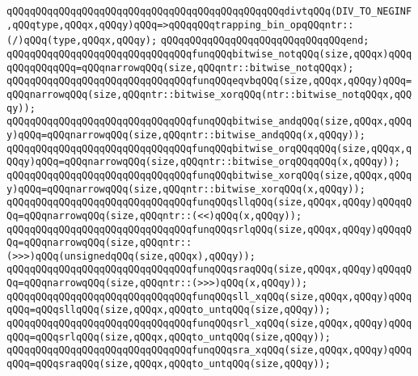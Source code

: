 \verb|qQQqqQQqqQQqqQQqqQQqqQQqqQQqqQQqqQQqqQQqqQQqqQQqdivtqQQq(DIV_TO_NEGINF,qQQqtype,qQQqx,qQQqy)qQQq=>qQQqqQQqtrapping_bin_opqQQqntr::(/)qQQq(type,qQQqx,qQQqy);|\newline
\verb|qQQqqQQqqQQqqQQqqQQqqQQqqQQqqQQqend;|\newline
\newline
\verb|qQQqqQQqqQQqqQQqqQQqqQQqqQQqqQQqfunqQQqbitwise_notqQQq(size,qQQqx)qQQqqQQqqQQqqQQq=qQQqnarrowqQQq(size,qQQqntr::bitwise_notqQQqx);|\newline
\verb|qQQqqQQqqQQqqQQqqQQqqQQqqQQqqQQqfunqQQqeqvbqQQq(size,qQQqx,qQQqy)qQQq=qQQqnarrowqQQq(size,qQQqntr::bitwise_xorqQQq(ntr::bitwise_notqQQqx,qQQqy));|\newline
\newline
\verb|qQQqqQQqqQQqqQQqqQQqqQQqqQQqqQQqfunqQQqbitwise_andqQQq(size,qQQqx,qQQqy)qQQq=qQQqnarrowqQQq(size,qQQqntr::bitwise_andqQQq(x,qQQqy));|\newline
\verb|qQQqqQQqqQQqqQQqqQQqqQQqqQQqqQQqfunqQQqbitwise_orqQQqqQQq(size,qQQqx,qQQqy)qQQq=qQQqnarrowqQQq(size,qQQqntr::bitwise_orqQQqqQQq(x,qQQqy));|\newline
\verb|qQQqqQQqqQQqqQQqqQQqqQQqqQQqqQQqfunqQQqbitwise_xorqQQq(size,qQQqx,qQQqy)qQQq=qQQqnarrowqQQq(size,qQQqntr::bitwise_xorqQQq(x,qQQqy));|\newline
\newline
\verb|qQQqqQQqqQQqqQQqqQQqqQQqqQQqqQQqfunqQQqsllqQQq(size,qQQqx,qQQqy)qQQqqQQq=qQQqnarrowqQQq(size,qQQqntr::(<<)qQQq(x,qQQqy));|\newline
\verb|qQQqqQQqqQQqqQQqqQQqqQQqqQQqqQQqfunqQQqsrlqQQq(size,qQQqx,qQQqy)qQQqqQQq=qQQqnarrowqQQq(size,qQQqntr::(>>>)qQQq(unsignedqQQq(size,qQQqx),qQQqy));|\newline
\verb|qQQqqQQqqQQqqQQqqQQqqQQqqQQqqQQqfunqQQqsraqQQq(size,qQQqx,qQQqy)qQQqqQQq=qQQqnarrowqQQq(size,qQQqntr::(>>>)qQQq(x,qQQqy));|\newline
\newline
\verb|qQQqqQQqqQQqqQQqqQQqqQQqqQQqqQQqfunqQQqsll_xqQQq(size,qQQqx,qQQqy)qQQqqQQq=qQQqsllqQQq(size,qQQqx,qQQqto_untqQQq(size,qQQqy));|\newline
\verb|qQQqqQQqqQQqqQQqqQQqqQQqqQQqqQQqfunqQQqsrl_xqQQq(size,qQQqx,qQQqy)qQQqqQQq=qQQqsrlqQQq(size,qQQqx,qQQqto_untqQQq(size,qQQqy));|\newline
\verb|qQQqqQQqqQQqqQQqqQQqqQQqqQQqqQQqfunqQQqsra_xqQQq(size,qQQqx,qQQqy)qQQqqQQq=qQQqsraqQQq(size,qQQqx,qQQqto_untqQQq(size,qQQqy));|\newline
\newline

